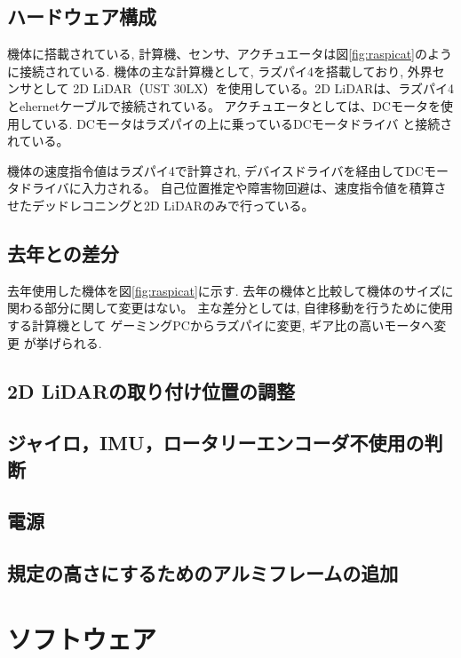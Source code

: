 \documentclass[twocolumn,9pt]{jsproceedings}
\begin{document}
\subsection{ハードウェア構成}

機体に搭載されている, 計算機、センサ、アクチュエータは図\ref{fig:raspicat}のように接続されている.
機体の主な計算機として, ラズパイ4を搭載しており, 外界センサとして
2D LiDAR（UST 30LX）を使用している。2D LiDARは、ラズパイ4とehernetケーブルで接続されている。
アクチュエータとしては、DCモータを使用している. DCモータはラズパイの上に乗っているDCモータドライバ
と接続されている。

機体の速度指令値はラズパイ4で計算され, デバイスドライバを経由してDCモータドライバに入力される。
自己位置推定や障害物回避は、速度指令値を積算させたデッドレコニングと2D LiDARのみで行っている。

\subsection{去年との差分}
 
去年使用した機体を図\ref{fig:raspicat}に示す. 
去年の機体と比較して機体のサイズに関わる部分に関して変更はない。
主な差分としては, 自律移動を行うために使用する計算機として
ゲーミングPCからラズパイに変更, ギア比の高いモータへ変更
が挙げられる.



\subsection{2D LiDARの取り付け位置の調整}

\subsection{ジャイロ，IMU，ロータリーエンコーダ不使用の判断}

\subsection{電源}

\subsection{規定の高さにするためのアルミフレームの追加}

\section{ソフトウェア}
\end{document}
